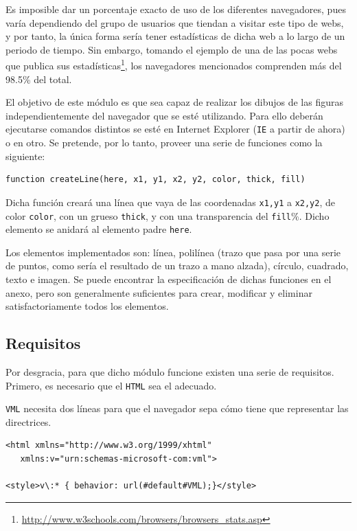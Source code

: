 Es imposible dar un porcentaje exacto de uso de los diferentes navegadores, pues varía dependiendo del grupo de usuarios que tiendan a visitar este tipo de webs, y por tanto, la única forma sería tener estadísticas de dicha web a lo largo de un periodo de tiempo. Sin embargo, tomando el ejemplo de una de las pocas webs que publica sus estadísticas\footnote{\url{http://www.w3schools.com/browsers/browsers_stats.asp}}, los navegadores mencionados comprenden más del 98.5\% del total.

El objetivo de este módulo es que sea capaz de realizar los dibujos de las figuras independientemente del navegador que se esté utilizando. Para ello deberán ejecutarse comandos distintos se esté en Internet Explorer (\texttt{IE} a partir de ahora) o en otro. Se pretende, por lo tanto, proveer una serie de funciones como la siguiente:

\begin{verbatim}
function createLine(here, x1, y1, x2, y2, color, thick, fill)
\end{verbatim}

Dicha función creará una línea que vaya de las coordenadas \texttt{x1,y1} a \texttt{x2,y2}, de color \texttt{color}, con un grueso \texttt{thick}, y con una transparencia del \texttt{fill}\%. Dicho elemento se anidará al elemento padre \texttt{here}.

Los elementos implementados son: línea, polilínea (trazo que pasa por una serie de puntos, como sería el resultado de un trazo a mano alzada), círculo, cuadrado, texto e imagen. Se puede encontrar la especificación de dichas funciones en el anexo, pero son generalmente suficientes para crear, modificar y eliminar satisfactoriamente todos los elementos.

\subsection{Requisitos}
Por desgracia, para que dicho módulo funcione existen una serie de requisitos. Primero, es necesario que el \texttt{HTML} sea el adecuado.

\texttt{VML} necesita dos líneas para que el navegador sepa cómo tiene que representar las directrices.
\begin{verbatim}
<html xmlns="http://www.w3.org/1999/xhtml" 
   xmlns:v="urn:schemas-microsoft-com:vml">

<style>v\:* { behavior: url(#default#VML);}</style>
\end{verbatim}

